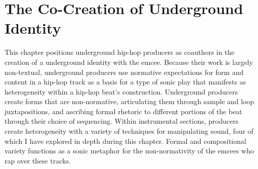 \section{The Co-Creation of Underground Identity}
This chapter positions underground hip-hop producers as coauthors in the creation of a underground
identity with the emcee. Because their work is largely non-textual, underground producers use
normative expectations for form and content in a hip-hop track as a basis for a type of sonic play
that manifests as heterogeneity within a hip-hop beat's construction. Underground producers create
forms that are non-normative, articulating them through sample and loop juxtapositions, and ascribing
formal rhetoric to different portions of the beat through their choice of sequencing. Within 
instrumental sections, producers create heterogeneity with a variety of techniques for manipulating 
sound, four of which I have explored in depth during this chapter. Formal and compositional variety 
functions as a sonic metaphor for the non-normativity of the emcees who rap over these tracks.